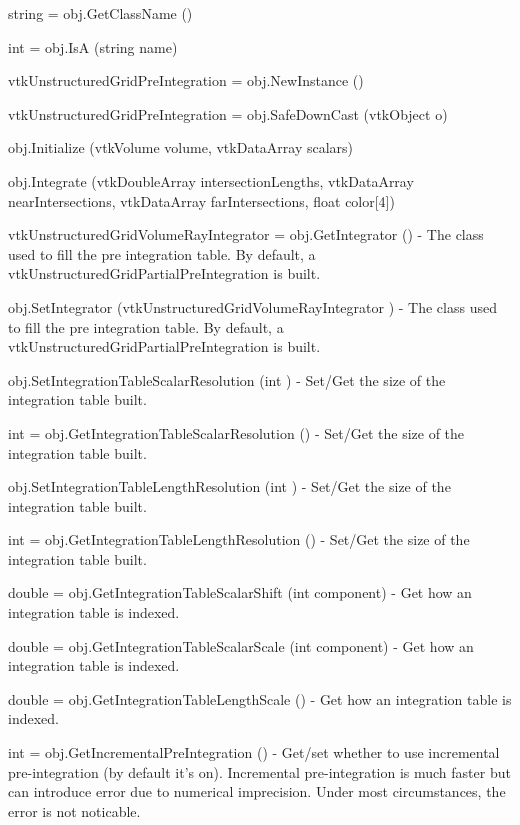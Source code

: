 \begin{DoxyItemize}
\item {\ttfamily string = obj.\-Get\-Class\-Name ()}  
\item {\ttfamily int = obj.\-Is\-A (string name)}  
\item {\ttfamily vtk\-Unstructured\-Grid\-Pre\-Integration = obj.\-New\-Instance ()}  
\item {\ttfamily vtk\-Unstructured\-Grid\-Pre\-Integration = obj.\-Safe\-Down\-Cast (vtk\-Object o)}  
\item {\ttfamily obj.\-Initialize (vtk\-Volume volume, vtk\-Data\-Array scalars)}  
\item {\ttfamily obj.\-Integrate (vtk\-Double\-Array intersection\-Lengths, vtk\-Data\-Array near\-Intersections, vtk\-Data\-Array far\-Intersections, float color\mbox{[}4\mbox{]})}  
\item {\ttfamily vtk\-Unstructured\-Grid\-Volume\-Ray\-Integrator = obj.\-Get\-Integrator ()} -\/ The class used to fill the pre integration table. By default, a vtk\-Unstructured\-Grid\-Partial\-Pre\-Integration is built.  
\item {\ttfamily obj.\-Set\-Integrator (vtk\-Unstructured\-Grid\-Volume\-Ray\-Integrator )} -\/ The class used to fill the pre integration table. By default, a vtk\-Unstructured\-Grid\-Partial\-Pre\-Integration is built.  
\item {\ttfamily obj.\-Set\-Integration\-Table\-Scalar\-Resolution (int )} -\/ Set/\-Get the size of the integration table built.  
\item {\ttfamily int = obj.\-Get\-Integration\-Table\-Scalar\-Resolution ()} -\/ Set/\-Get the size of the integration table built.  
\item {\ttfamily obj.\-Set\-Integration\-Table\-Length\-Resolution (int )} -\/ Set/\-Get the size of the integration table built.  
\item {\ttfamily int = obj.\-Get\-Integration\-Table\-Length\-Resolution ()} -\/ Set/\-Get the size of the integration table built.  
\item {\ttfamily double = obj.\-Get\-Integration\-Table\-Scalar\-Shift (int component)} -\/ Get how an integration table is indexed.  
\item {\ttfamily double = obj.\-Get\-Integration\-Table\-Scalar\-Scale (int component)} -\/ Get how an integration table is indexed.  
\item {\ttfamily double = obj.\-Get\-Integration\-Table\-Length\-Scale ()} -\/ Get how an integration table is indexed.  
\item {\ttfamily int = obj.\-Get\-Incremental\-Pre\-Integration ()} -\/ Get/set whether to use incremental pre-\/integration (by default it's on). Incremental pre-\/integration is much faster but can introduce error due to numerical imprecision. Under most circumstances, the error is not noticable.  

\end{DoxyItemize}
